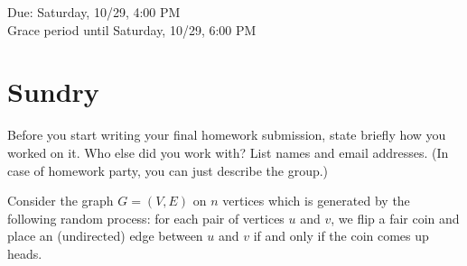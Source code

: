 \documentclass[11pt]{article}
\begin{document}
\maketitle
\fontsize{12}{15}\selectfont

\begin{center}
    Due: Saturday, 10/29, 4:00 PM \\
    Grace period until Saturday, 10/29, 6:00 PM \\
\end{center}

\section*{Sundry}
Before you start writing your final homework submission, state briefly how you worked on it.  Who else did you work with?  List names and email addresses.  (In case of homework party, you can just describe the group.)

{\color{blue}{I went to office hours on thursday and friday to receive guidance on problems 3 and 6, and I worked on problem 2 with a couple people there who stayed after office hours were over on thursday.}}

\vspace{15pt}


Consider the graph $G = (V,E)$ on $n$ vertices which is generated by the following random process: for each pair of vertices $u$ and $v$, we flip a fair coin and place an (undirected) edge between $u$ and $v$ if and only if the coin comes up heads.
\end{document}
